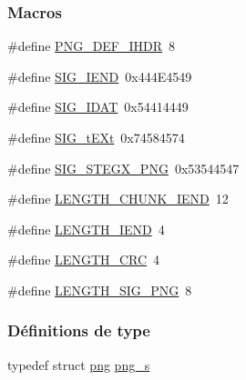 \subsubsection*{Macros}
\begin{DoxyCompactItemize}
\item 
\#define \hyperlink{a00095_a26323106d2b60eb827c0889c658d91e1}{P\+N\+G\+\_\+\+D\+E\+F\+\_\+\+I\+H\+DR}~8
\item 
\#define \hyperlink{a00095_a93096a25f40187501506b8b775119b4a}{S\+I\+G\+\_\+\+I\+E\+ND}~0x444\+E4549
\item 
\#define \hyperlink{a00095_a634801961cc73b81c30edc286556c781}{S\+I\+G\+\_\+\+I\+D\+AT}~0x54414449
\item 
\#define \hyperlink{a00095_a62c1ea4563bb6718526bdc2cdc652b5c}{S\+I\+G\+\_\+t\+E\+Xt}~0x74584574
\item 
\#define \hyperlink{a00095_acd49fabf599d0ee1224d90bdfe2e9de8}{S\+I\+G\+\_\+\+S\+T\+E\+G\+X\+\_\+\+P\+NG}~0x53544547
\item 
\#define \hyperlink{a00095_a38cdc6b069846fcd541e77b8f2e55d22}{L\+E\+N\+G\+T\+H\+\_\+\+C\+H\+U\+N\+K\+\_\+\+I\+E\+ND}~12
\item 
\#define \hyperlink{a00095_ae5c81215d8f14ec1d20647029a22cf7c}{L\+E\+N\+G\+T\+H\+\_\+\+I\+E\+ND}~4
\item 
\#define \hyperlink{a00095_a66b45cefa7e813509629dfff0680c50b}{L\+E\+N\+G\+T\+H\+\_\+\+C\+RC}~4
\item 
\#define \hyperlink{a00095_ab0b5f0b6d9c3b7aee8b41934ec34d1c4}{L\+E\+N\+G\+T\+H\+\_\+\+S\+I\+G\+\_\+\+P\+NG}~8
\end{DoxyCompactItemize}
\subsubsection*{Définitions de type}
\begin{DoxyCompactItemize}
\item 
typedef struct \hyperlink{a00174}{png} \hyperlink{a00095_a714e5dc9c1149c3bec03347018bdecc7}{png\+\_\+s}
\end{DoxyCompactItemize}
